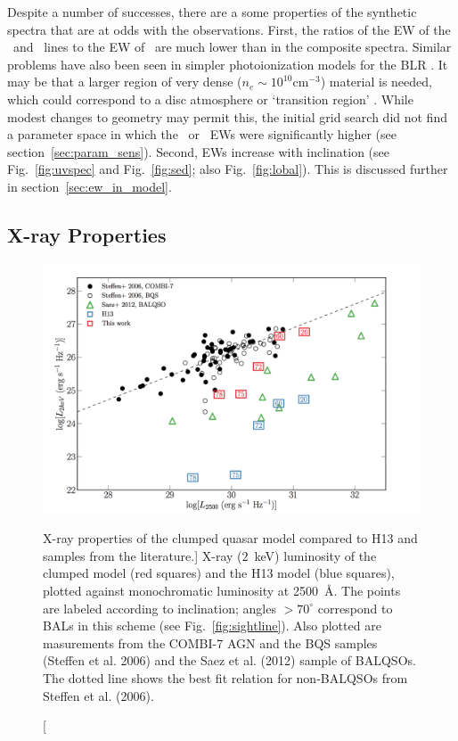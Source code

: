 Despite a number of successes, 
there are a some properties of the synthetic spectra
that are at odds with the observations. First, the ratios of the 
EW of the \la\ and \mgline\ lines
to the EW of \civline\ are much lower than in the composite spectra. 
Similar problems have also been seen in simpler photoionization models for the 
BLR \citep{netzer1990}.
It may be that a larger region of very dense ($n_e\sim10^{10}$cm$^{-3}$) 
material is needed, which could correspond to a disc atmosphere or 
`transition region' 
\citep[see e.g.][]{MCGV95,knigge1998}. \nocite{knigge1998} 
While modest changes to geometry may permit this, the initial grid search 
did not find a parameter space in which the \la\ or \mg\ EWs
were significantly higher (see section~\ref{sec:param_sens}). 
Second, EWs increase with inclination 
(see Fig.~\ref{fig:uvspec} and Fig.~\ref{fig:sed}; also Fig.~\ref{fig:lobal}).
This is discussed further in section~\ref{sec:ew_in_model}.

\subsection{X-ray Properties}
\label{sec:xray}


\begin{figure}
\centering
\includegraphics[width=1.0\textwidth]{figures/06-agnpaper/fig6.png}
\caption
[X-ray properties of the clumped quasar model compared to H13 and samples
from the literature.]
{
X-ray ($2$~keV) luminosity of the clumped model (red squares) 
and the H13 model (blue squares), plotted against monochromatic luminosity 
at 2500~\AA. The points are labeled according to inclination; angles
$>70^\circ$ correspond to BALs in this scheme (see Fig.~\ref{fig:sightline}).
Also plotted are masurements from 
the COMBI-7 AGN and the BQS samples (Steffen et al. 2006) and the Saez et al. (2012) 
sample of BALQSOs. The dotted line shows the best fit relation for non-BALQSOs 
from Steffen et al. (2006).
}
\label{fig:xray}
\end{figure}

